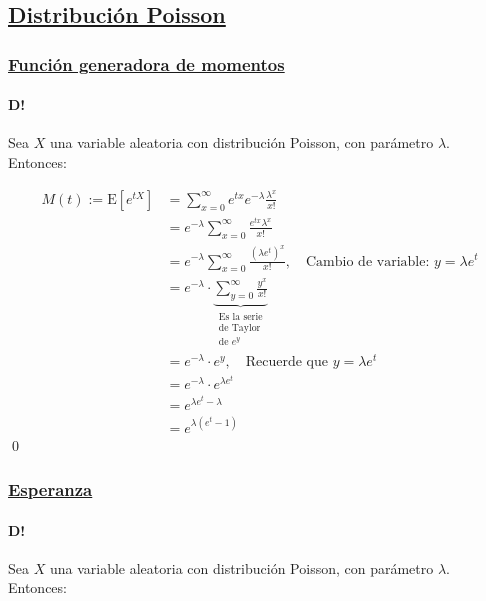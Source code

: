 \documentclass[8pt]{article}
\begin{document}
\subsection*{\hyperref[subsec:distribucion_poisson_tag]{Distribución Poisson}}
\label{subsec:distribucion_poisson}

\subsubsection*{\hyperref[subsec:funciongeneradora_poisson_tag]{Función generadora de momentos}}
\label{subsec:funciongeneradora_poisson}

\paragraph{D!} Sea $X$ una variable aleatoria con distribución Poisson, con parámetro $\lambda$. Entonces:

\begin{align*}
    M(t) := \text{E}\left[e^{tX}\right] &= \sum_{x=0}^\infty e^{tx} e^{-\lambda} \frac{\lambda^x}{x!} \\
    &= e^{-\lambda} \sum_{x=0}^\infty \frac{e^{tx} \lambda^x}{x!} \\
    &= e^{-\lambda} \sum_{x=0}^\infty \frac{(\lambda e^t)^x}{x!}, \quad \text{Cambio de variable: } y = \lambda e^t \\
    &= e^{-\lambda} \cdot \underbrace{\sum_{y=0}^\infty \frac{y^x}{x!}}_{\substack{\text{Es la serie}\\\text{de Taylor}\\\text{de } e^y}} \\
    &= e^{-\lambda} \cdot e^y, \quad \text{Recuerde que } y = \lambda e^t \\
    &= e^{-\lambda} \cdot e^{\lambda e^t} \\
    &= e^{\lambda e^t - \lambda} \\
    &= e^{\lambda (e^t - 1)}
\end{align*}\qed

\subsubsection*{\hyperref[subsec:esperanza_poisson_tag]{Esperanza}}
\label{subsec:esperanza_poisson}

\paragraph{D!} Sea $X$ una variable aleatoria con distribución Poisson, con parámetro $\lambda$. Entonces:
\end{document}
